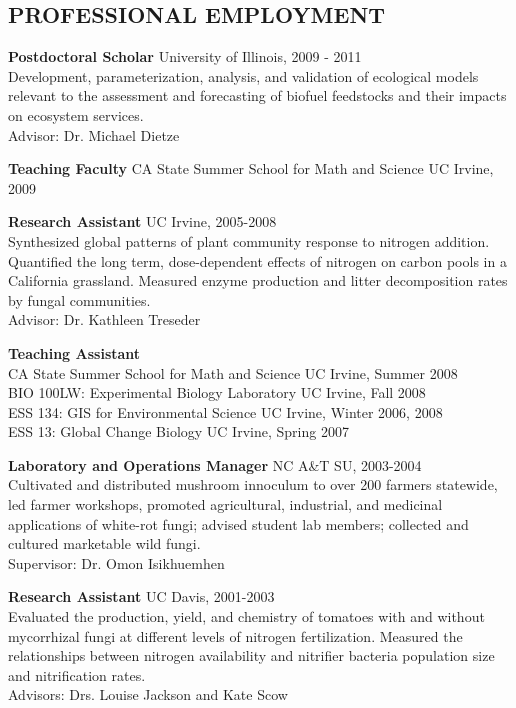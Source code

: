 \documentclass[line,10pt]{res}
\begin{document}
\begin{resume}
\section{PROFESSIONAL EMPLOYMENT}
 {\bf  Postdoctoral Scholar} \hfill University of Illinois, 2009 - 2011 \\Development, parameterization, analysis, and validation of ecological models relevant to the assessment and forecasting of biofuel feedstocks and their impacts on ecosystem services.\\
  Advisor: Dr. Michael Dietze

{\bf Teaching Faculty} CA State Summer School for Math and Science  \hfill UC Irvine, 2009      

{\bf  Research Assistant} \hfill UC Irvine, 2005-2008 \\
    Synthesized global patterns of plant community response to nitrogen addition. Quantified the long term, dose-dependent effects of nitrogen on carbon pools in a California grassland. Measured enzyme production and litter decomposition rates by fungal communities. \\Advisor: Dr. Kathleen Treseder

               {\bf  Teaching Assistant} \hfill \\
CA State Summer School for Math and Science  \hfill             UC Irvine, Summer 2008\\
BIO 100LW: Experimental Biology Laboratory \hfill               UC Irvine, Fall 2008\\
ESS 134: GIS for Environmental Science \hfill                   UC Irvine, Winter 2006, 2008\\
ESS 13: Global Change Biology  \hfill                           UC Irvine, Spring 2007

{\bf Laboratory and Operations Manager} \hfill NC A\&T SU, 2003-2004 \\
Cultivated and distributed mushroom innoculum to over 200 farmers statewide, led farmer workshops, promoted agricultural, industrial, and medicinal applications of white-rot fungi; advised student lab members; collected and cultured marketable wild fungi. \\Supervisor: Dr. Omon Isikhuemhen

{\bf  Research Assistant} \hfill UC Davis, 2001-2003 \\   Evaluated the production, yield, and chemistry of tomatoes with and without mycorrhizal fungi at different levels of nitrogen fertilization. Measured the relationships between nitrogen availability and nitrifier bacteria population size and nitrification rates. \\Advisors: Drs. Louise Jackson and  Kate Scow


\end{resume}
\end{document}
